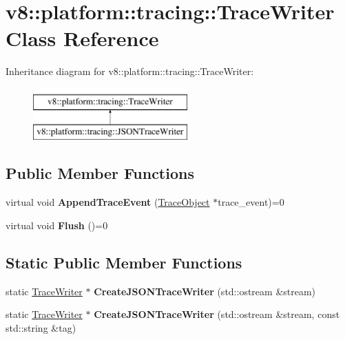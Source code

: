 \hypertarget{classv8_1_1platform_1_1tracing_1_1TraceWriter}{}\section{v8\+:\+:platform\+:\+:tracing\+:\+:Trace\+Writer Class Reference}
\label{classv8_1_1platform_1_1tracing_1_1TraceWriter}
Inheritance diagram for v8\+:\+:platform\+:\+:tracing\+:\+:Trace\+Writer\+:\begin{figure}[H]
\begin{center}
\leavevmode
\includegraphics[height=2.000000cm]{classv8_1_1platform_1_1tracing_1_1TraceWriter}
\end{center}
\end{figure}
\subsection*{Public Member Functions}
\begin{DoxyCompactItemize}
\item 
\mbox{\label{classv8_1_1platform_1_1tracing_1_1TraceWriter_a1dde3c2f986e08d9e0c3b7e3c0279661}} 
virtual void {\bfseries Append\+Trace\+Event} (\mbox{\hyperlink{classv8_1_1platform_1_1tracing_1_1TraceObject}{Trace\+Object}} $\ast$trace\+\_\+event)=0
\item 
\mbox{\label{classv8_1_1platform_1_1tracing_1_1TraceWriter_acb377e35f2a881b0522d23b3153d9501}} 
virtual void {\bfseries Flush} ()=0
\end{DoxyCompactItemize}
\subsection*{Static Public Member Functions}
\begin{DoxyCompactItemize}
\item 
\mbox{\label{classv8_1_1platform_1_1tracing_1_1TraceWriter_aa311d849efeb96b7a2d6c00e6525535e}} 
static \mbox{\hyperlink{classv8_1_1platform_1_1tracing_1_1TraceWriter}{Trace\+Writer}} $\ast$ {\bfseries Create\+J\+S\+O\+N\+Trace\+Writer} (std\+::ostream \&stream)
\item 
\mbox{\label{classv8_1_1platform_1_1tracing_1_1TraceWriter_acd956b6904bc84b61afab87e74eb7d3a}} 
static \mbox{\hyperlink{classv8_1_1platform_1_1tracing_1_1TraceWriter}{Trace\+Writer}} $\ast$ {\bfseries Create\+J\+S\+O\+N\+Trace\+Writer} (std\+::ostream \&stream, const std\+::string \&tag)
\end{DoxyCompactItemize}


